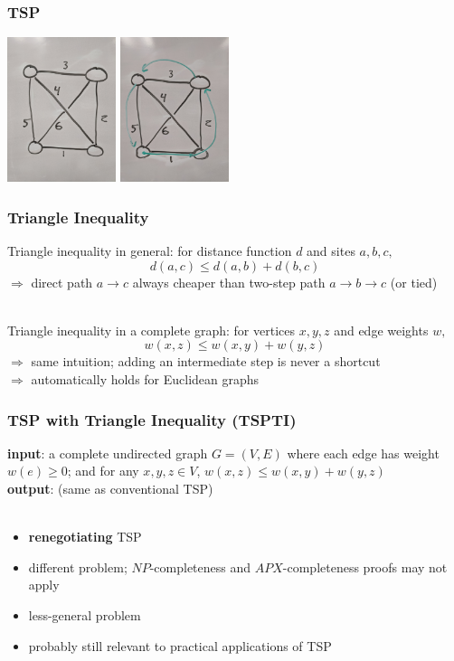 \documentclass{beamer}
\newcommand{\stanza}{ \\~\ }
\begin{document}
  \begin{frame} \frametitle{TSP}
    \begin{center}
      \includegraphics[height=120pt]{13-tsp-input.jpg}
      \includegraphics[height=120pt]{13-tsp-output.jpg}
    \end{center}
  \end{frame}
  
  \begin{frame} \frametitle{Triangle Inequality}
  Triangle inequality in general: for distance function $d$ and sites $a, b, c,$
  \[ d(a, c) \leq d(a, b) + d(b, c) \]
  $\Rightarrow$ direct path $a \rightarrow c$ always cheaper than two-step path
  $a \rightarrow b \rightarrow c$ (or tied) \stanza
  
  Triangle inequality in a complete graph: for vertices $x, y, z$ and edge weights $w,$
  \[ w(x, z) \leq w(x, y) + w(y, z) \]
  $\Rightarrow$ same intuition; adding an intermediate step is never a shortcut \\
  $\Rightarrow$ automatically holds for Euclidean graphs
  \end{frame}
  
  \begin{frame} \frametitle{TSP with Triangle Inequality (TSPTI)}
  
  \textbf{input}: a complete undirected graph $G=(V,E)$ where each edge has weight $w(e) \geq 0$;
  and for any $x, y, z \in V$, $w(x, z) \leq w(x, y) + w(y, z)$ \\
  \textbf{output}: (same as conventional TSP) \stanza
  \begin{itemize}
    \item \textbf{renegotiating} TSP
    \item different problem; $NP$-completeness and $APX$-completeness proofs may not apply
    \item less-general problem
    \item probably still relevant to practical applications of TSP
  \end{itemize}
  \end{frame}
  
\end{document}
